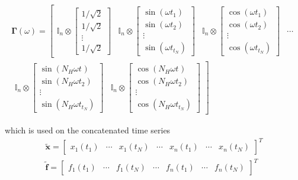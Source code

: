 \begin{equation}
  \label{eq:hb_gamma}
  \begin{aligned}
    \bm \Gamma(\omega) =
    \left[
  \begin{matrix}
    \mathbb{I}_n \otimes
    \begin{bmatrix}
      1/\sqrt{2} \\ 1/\sqrt{2} \\ \vdots \\ 1/\sqrt{2}
    \end{bmatrix} &
    \mathbb{I}_n \otimes
    \begin{bmatrix}
      \sin(\omega t_1) \\ \sin(\omega t_2) \\ \vdots \\ \sin(\omega t_{t_N})
    \end{bmatrix} &
    \mathbb{I}_n \otimes
    \begin{bmatrix}
      \cos(\omega t_1) \\ \cos(\omega t_2) \\ \vdots \\ \cos(\omega t_{t_N})
    \end{bmatrix}&
        \cdots
  \end{matrix}
\right. \\
\left.
  \begin{matrix}
    \mathbb{I}_n \otimes
    \begin{bmatrix}
      \sin(N_H\omega t_{}) \\ \sin(N_H\omega t_2) \\ \vdots \\ \sin(N_H\omega t_{t_N})
    \end{bmatrix} &
    \mathbb{I}_n \otimes
    \begin{bmatrix}
      \cos(N_H\omega t_{}) \\ \cos(N_H\omega t_2) \\ \vdots \\ \cos(N_H\omega t_{t_N})
    \end{bmatrix}
  \end{matrix}
\right]
\end{aligned}
\end{equation}

which is used on the concatenated time series
\begin{equation}
  \label{eq:hb_time_series}
  \begin{aligned}
    \tilde{\bm x} =
    \begin{bmatrix}
      x_1(t_1) & \cdots & x_1(t_N) & \cdots & x_n(t_1) & \cdots & x_n(t_N)
    \end{bmatrix}^T\\
    \tilde{\bm f} =
    \begin{bmatrix}
      f_1(t_1) & \cdots & f_1(t_N) & \cdots & f_n(t_1) & \cdots & f_n(t_N)
    \end{bmatrix}^T
  \end{aligned}
\end{equation}

